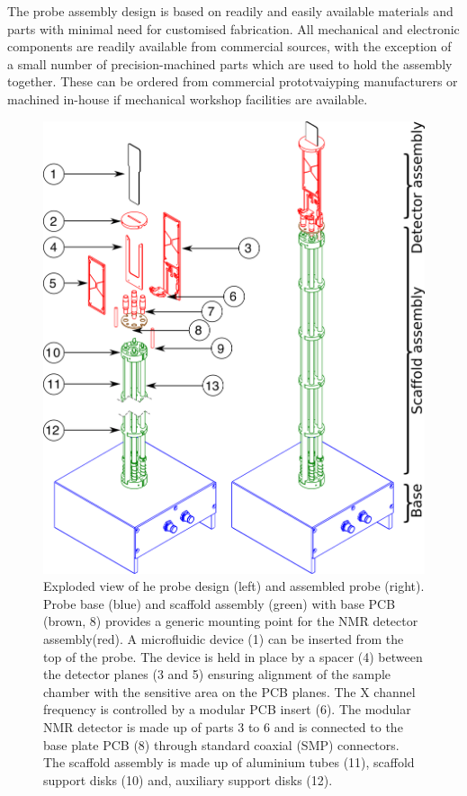 \documentclass[preprint,5p]{elsarticle}
\begin{document}
The probe assembly design is based on readily and easily available materials and parts 
with minimal need for customised fabrication.
All mechanical and electronic components are readily available from commercial sources, 
with the exception of a small number of precision-machined parts which are used 
to hold the assembly together. These can be ordered from commercial prototvaiyping 
manufacturers or machined in-house if mechanical workshop facilities are available.

\begin{figure}
\centering
\includegraphics[width=.7\linewidth,keepaspectratio=true]{./figures/ms5n17-tlp-im-181007-Probe-explode.png} 
\caption{Exploded view of he probe design (left) and assembled probe (right). 
Probe base (blue) and scaffold assembly (green) with base PCB (brown, 8) provides a 
generic mounting point for the NMR detector assembly(red). 
A microfluidic device (1) can be inserted from the top of the probe. 
The device is held in place by a spacer (4) between the detector planes (3 and 5) 
ensuring alignment of the sample chamber with the sensitive area on the PCB planes. 
The X channel frequency is controlled by a 
modular PCB insert (6). The modular NMR detector is made up of parts 3 to 6 and is 
connected to the base plate PCB (8) through standard coaxial (SMP) connectors. 
The scaffold assembly is made up of aluminium tubes (11), scaffold support disks (10) 
and, auxiliary support disks (12).}
\label{fig:probe-explode} 
\end{figure}
\end{document}
